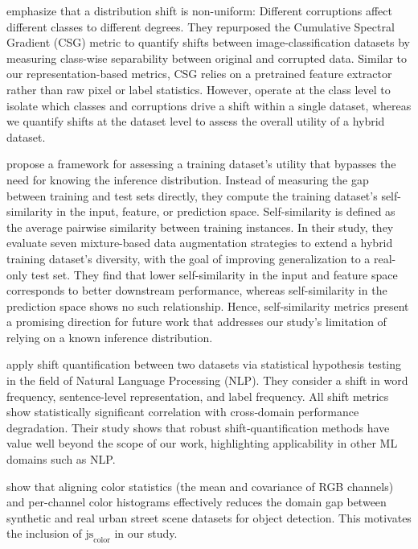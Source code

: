 \documentclass[conference]{IEEEtran}
\begin{document}
\cite{renza2024} emphasize that a distribution shift is non-uniform: Different corruptions affect different classes to different degrees. They repurposed the Cumulative Spectral Gradient (CSG) metric to quantify shifts between image-classification datasets by measuring class-wise separability between original and corrupted data. Similar to our representation-based metrics, CSG relies on a pretrained feature extractor rather than raw pixel or label statistics. However, \cite{renza2024} operate at the class level to isolate which classes and corruptions drive a shift within a single dataset, whereas we quantify shifts at the dataset level to assess the overall utility of a hybrid dataset.

\cite{dale2024} propose a framework for assessing a training dataset’s utility that bypasses the need for knowing the inference distribution. Instead of measuring the gap between training and test sets directly, they compute the training dataset’s self-similarity in the input, feature, or prediction space. Self-similarity is defined as the average pairwise similarity between training instances. In their study, they evaluate seven mixture-based data augmentation strategies to extend a hybrid training dataset's diversity, with the goal of improving generalization to a real-only test set. They find that lower self-similarity in the input and feature space corresponds to better downstream performance, whereas self-similarity in the prediction space shows no such relationship. Hence, self-similarity metrics present a promising direction for future work that addresses our study’s limitation of relying on a known inference distribution.

\cite{li2025} apply shift quantification between two datasets via statistical hypothesis testing in the field of Natural Language Processing (NLP). They consider a shift in word frequency, sentence-level representation, and label frequency. All shift metrics show statistically significant correlation with cross‑domain performance degradation. Their study shows that robust shift‑quantification methods have value well beyond the scope of our work, highlighting applicability in other ML domains such as NLP.

\cite{abramov2020} show that aligning color statistics (the mean and covariance of RGB channels) and per-channel color histograms effectively reduces the domain gap between synthetic and real urban street scene datasets for object detection. This motivates the inclusion of $\text{js}_{\text{color}}$ in our study.
\end{document}
